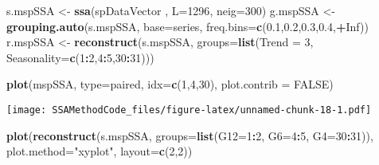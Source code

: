 \documentclass[
]{article}
\newenvironment{Shaded}{\begin{snugshade}}{\end{snugshade}}
\newcommand{\AttributeTok}[1]{\textcolor[rgb]{0.13,0.29,0.53}{#1}}
\newcommand{\ConstantTok}[1]{\textcolor[rgb]{0.56,0.35,0.01}{#1}}
\newcommand{\DecValTok}[1]{\textcolor[rgb]{0.00,0.00,0.81}{#1}}
\newcommand{\FloatTok}[1]{\textcolor[rgb]{0.00,0.00,0.81}{#1}}
\newcommand{\FunctionTok}[1]{\textcolor[rgb]{0.13,0.29,0.53}{\textbf{#1}}}
\newcommand{\NormalTok}[1]{#1}
\newcommand{\OtherTok}[1]{\textcolor[rgb]{0.56,0.35,0.01}{#1}}
\newcommand{\SpecialCharTok}[1]{\textcolor[rgb]{0.81,0.36,0.00}{\textbf{#1}}}
\newcommand{\StringTok}[1]{\textcolor[rgb]{0.31,0.60,0.02}{#1}}
\begin{document}
\begin{Shaded}
\begin{Highlighting}[]
\NormalTok{s.mspSSA }\OtherTok{\textless{}{-}} \FunctionTok{ssa}\NormalTok{(spDataVector , }\AttributeTok{L=}\DecValTok{1296}\NormalTok{, }\AttributeTok{neig=}\DecValTok{300}\NormalTok{)}
\NormalTok{g.mspSSA }\OtherTok{\textless{}{-}} \FunctionTok{grouping.auto}\NormalTok{(s.mspSSA, }\AttributeTok{base=}\StringTok{\textquotesingle{}series\textquotesingle{}}\NormalTok{, }\AttributeTok{freq.bins=}\FunctionTok{c}\NormalTok{(}\FloatTok{0.1}\NormalTok{,}\FloatTok{0.2}\NormalTok{,}\FloatTok{0.3}\NormalTok{,}\FloatTok{0.4}\NormalTok{,}\SpecialCharTok{+}\ConstantTok{Inf}\NormalTok{))}
\NormalTok{r.mspSSA }\OtherTok{\textless{}{-}} \FunctionTok{reconstruct}\NormalTok{(s.mspSSA, }\AttributeTok{groups=}\FunctionTok{list}\NormalTok{(}\AttributeTok{Trend =} \DecValTok{3}\NormalTok{, }\AttributeTok{Seasonality=}\FunctionTok{c}\NormalTok{(}\DecValTok{1}\SpecialCharTok{:}\DecValTok{2}\NormalTok{,}\DecValTok{4}\SpecialCharTok{:}\DecValTok{5}\NormalTok{,}\DecValTok{30}\SpecialCharTok{:}\DecValTok{31}\NormalTok{)))}
\end{Highlighting}
\end{Shaded}

\begin{Shaded}
\begin{Highlighting}[]
\FunctionTok{plot}\NormalTok{(mspSSA, }\AttributeTok{type=}\StringTok{\textquotesingle{}paired\textquotesingle{}}\NormalTok{, }\AttributeTok{idx=}\FunctionTok{c}\NormalTok{(}\DecValTok{1}\NormalTok{,}\DecValTok{4}\NormalTok{,}\DecValTok{30}\NormalTok{), }\AttributeTok{plot.contrib =} \ConstantTok{FALSE}\NormalTok{)}
\end{Highlighting}
\end{Shaded}

\texttt{[image: SSAMethodCode\_files/figure-latex/unnamed-chunk-18-1.pdf]}

\begin{Shaded}
\begin{Highlighting}[]
\FunctionTok{plot}\NormalTok{(}\FunctionTok{reconstruct}\NormalTok{(s.mspSSA, }\AttributeTok{groups=}\FunctionTok{list}\NormalTok{(}\AttributeTok{G12=}\DecValTok{1}\SpecialCharTok{:}\DecValTok{2}\NormalTok{, }\AttributeTok{G6=}\DecValTok{4}\SpecialCharTok{:}\DecValTok{5}\NormalTok{, }\AttributeTok{G4=}\DecValTok{30}\SpecialCharTok{:}\DecValTok{31}\NormalTok{)), }\AttributeTok{plot.method=}\StringTok{"xyplot"}\NormalTok{, }\AttributeTok{layout=}\FunctionTok{c}\NormalTok{(}\DecValTok{2}\NormalTok{,}\DecValTok{2}\NormalTok{))}
\end{Highlighting}
\end{Shaded}
\end{document}
